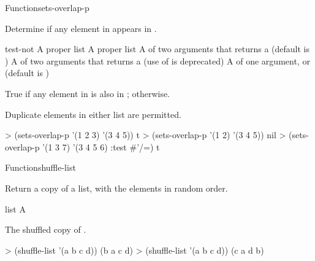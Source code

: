 \documentclass[10pt,twoside,english,pdftex]{article}
\begin{document}
\begin{functiondoc}{Function}{sets-overlap-p}{
     
    \returns{} }

\fnsyntax

\fnpurpose Determine if any element in  appears in 
.

\fnpackage {}

\fnmodule {}

\fnargs
\begin{args}{test-not}
\arg[list-1] A proper list
\arg[list-2] A proper list
\arg[test] A  of two arguments that returns a
 (default is ) 
 A  of two arguments that returns a
 (use of  is deprecated)
\arg[key] A  of one argument, or \nil{} (default is \nil)
\end{args}

\fnreturns True if any element in  is also in
; \nil{} otherwise.

\fndescription Duplicate elements in either list are permitted.

\fnexamples
%
\W\supp
\begin{example}
> (sets-overlap-p '(1 2 3) '(3 4 5))
t
> (sets-overlap-p '(1 2) '(3 4 5))
nil
> (sets-overlap-p '(1 3 7) '(3 4 5 6) :test #'/=)
t
\end{example}

\end{functiondoc}


\begin{functiondoc}{Function}{shuffle-list}{
  \returns{} }
%

\fnsyntax

\fnpurpose Return a copy of a list, with the elements in random order.

\fnpackage {}

\fnmodule {}

\fnargs
\begin{args}{list}
\arg[list] A 
\end{args}

\fnreturns The shuffled copy of .

\fnexamples
%
\W\supp
\begin{example}
> (shuffle-list '(a b c d))
(b a c d)
> (shuffle-list '(a b c d))
(c a d b)
\end{example}

\end{functiondoc}
\end{document}
